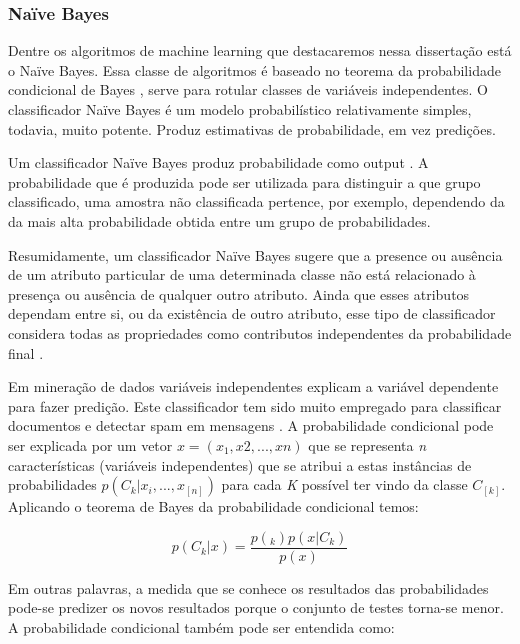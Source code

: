 \subsubsection{Naïve Bayes}

Dentre os algoritmos de machine learning que destacaremos nessa dissertação está o Naïve Bayes. 
Essa classe de algoritmos é baseado no teorema da probabilidade condicional de Bayes \cite{montgomery2000estatistica}, serve 
para rotular classes de variáveis independentes. O classificador Naïve Bayes é um modelo probabilístico relativamente simples, todavia, muito potente. Produz estimativas de probabilidade, em vez predições.

Um classificador Naïve Bayes produz probabilidade como output \cite{policarpo2015semantic}. A probabilidade que é produzida pode ser utilizada para distinguir a que grupo classificado, uma amostra não classificada pertence, por exemplo, dependendo da da mais alta probabilidade obtida entre um grupo de probabilidades.

Resumidamente, um classificador Naïve Bayes sugere que a presence ou ausência de um atributo particular de uma determinada classe não está relacionado à presença ou ausência de qualquer outro atributo. Ainda que esses atributos dependam entre si, ou da existência de outro atributo, esse tipo de classificador considera todas as propriedades como contributos independentes da probabilidade final \cite{policarpo2015semantic}.

Em mineração de dados variáveis independentes explicam a variável dependente para fazer predição.
Este classificador tem sido muito empregado para classificar documentos e detectar spam em mensagens \cite{bibid}. 
A probabilidade condicional pode ser explicada por um vetor $x = (x_{1}, x{2}, ..., x{n})$ que se representa \textit{n} características (variáveis independentes) que se atribui a estas instâncias de probabilidades $p(C_{k}|x_{i},...,x_[n])$ para cada \textit{K} possível ter vindo da classe $C_[k]$. Aplicando o teorema de Bayes da probabilidade condicional temos:

\begin{equation}
p(C_{k}|x) = \frac{p(_{k})p(x|C_{k})}{p(x)}
\end{equation}

Em outras palavras, a medida que se conhece os resultados das probabilidades pode-se predizer os novos resultados porque o conjunto de testes torna-se menor. A probabilidade condicional também pode ser entendida como:

